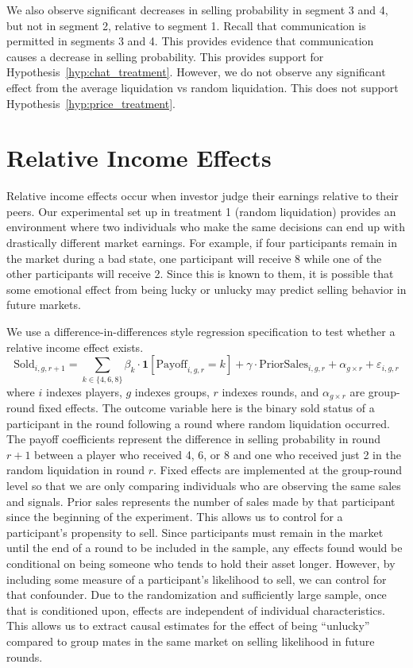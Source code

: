 \documentclass[thesis]{uathesis}
\begin{document}
\begin{body}
We also observe significant decreases in selling probability in segment 3 and 4, but not in segment 2, relative to segment 1. Recall that communication is permitted in segments 3 and 4. This provides evidence that communication causes a decrease in selling probability. This provides support for Hypothesis~\ref{hyp:chat_treatment}. However, we do not observe any significant effect from the average liquidation vs random liquidation. This does not support Hypothesis~\ref{hyp:price_treatment}.





\section{Relative Income Effects}

Relative income effects occur when investor judge their earnings relative to their peers. Our experimental set up in treatment 1 (random liquidation) provides an environment where two individuals who make the same decisions can end up with drastically different market earnings. For example, if four participants remain in the market during a bad state, one participant will receive 8 while one of the other participants will receive 2. Since this is known to them, it is possible that some emotional effect from being lucky or unlucky may predict selling behavior in future markets.

We use a difference-in-differences style regression specification to test whether a relative income effect exists.
\begin{equation}
\text{Sold}_{i,g,r+1} = \sum_{k \in \{4,6,8\}} \beta_k \cdot \mathbf{1}[\text{Payoff}_{i,g,r} = k] + \gamma \cdot \text{PriorSales}_{i,g,r} + \alpha_{g \times r} + \varepsilon_{i,g,r}
\end{equation}
where $i$ indexes players, $g$ indexes groups, $r$ indexes rounds, and $\alpha_{g\times r}$ are group-round fixed effects. The outcome variable here is the binary sold status of a participant in the round following a round where random liquidation occurred. The payoff coefficients represent the difference in selling probability in round $r+1$ between a player who received 4, 6, or 8 and one who received just 2 in the random liquidation in round $r$. Fixed effects are implemented at the group-round level so that we are only comparing individuals who are observing the same sales and signals. Prior sales represents the number of sales made by that participant since the beginning of the experiment. This allows us to control for a participant's propensity to sell.  Since participants must remain in the market until the end of a round to be included in the sample, any effects found would be conditional on being someone who tends to hold their asset longer. However, by including some measure of a participant's likelihood to sell, we can control for that confounder. Due to the randomization and sufficiently large sample, once that is conditioned upon, effects are independent of individual characteristics. This allows us to extract causal estimates for the effect of being ``unlucky'' compared to group mates in the same market on selling likelihood in future rounds.


\end{body}
\end{document}
